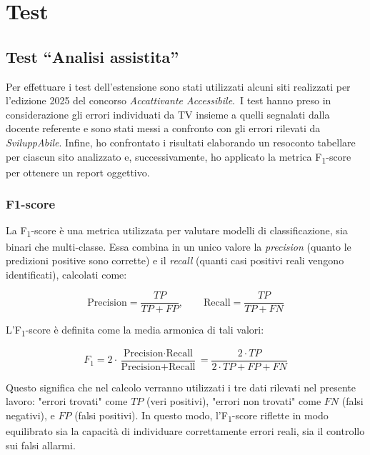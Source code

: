 
\hypersetup{
  colorlinks=true,
  linkcolor=blue,   %
  citecolor=blue,   %
  urlcolor=darkblue  %
}

\DeclareRobustCommand{\wcagref}[2][]{%
  \hyperref[#1]{\textcolor{emerald}{#2}}%
}

\chapter{Test}
\label{chap:test}

\section{Test ``Analisi assistita''}
\noindent Per effettuare i test dell’estensione sono stati utilizzati alcuni siti realizzati per l'edizione 2025 del concorso \textit{Accattivante Accessibile}.\
I test hanno preso in considerazione gli errori individuati da TV insieme a quelli segnalati dalla docente referente e sono stati messi a confronto con gli errori rilevati da \textit{SviluppAbile}.
Infine, ho confrontato i risultati elaborando un resoconto tabellare per ciascun sito analizzato e, successivamente, ho applicato la metrica F\textsubscript{1}-score per ottenere un report oggettivo.

\subsection{F1-score}
\noindent La F\textsubscript{1}-score è una metrica utilizzata per valutare modelli di classificazione, sia binari che multi‐classe. Essa combina in un unico valore la \textit{precision} (quanto le predizioni positive sono corrette) e il \textit{recall} (quanti casi positivi reali vengono identificati), calcolati come:

\[
\text{Precision} = \frac{TP}{TP + FP}, 
\qquad
\text{Recall} = \frac{TP}{TP + FN}
\]

\vspace{0.5cm}
\noindent L’F\textsubscript{1}-score è definita come la media armonica di tali valori:

\[
F_{1} = 2 \cdot \frac{\text{Precision} \cdot \text{Recall}}{\text{Precision} + \text{Recall}}
 = \frac{2 \cdot TP}{2 \cdot TP + FP + FN}
\]
\vspace{0.1cm}

\noindent Questo significa che nel calcolo verranno utilizzati i tre dati rilevati nel presente lavoro:
"errori trovati" come \(TP\) (veri positivi), "errori non trovati" come \(FN\) (falsi negativi), e \(FP\) (falsi positivi).
In questo modo, l’F\textsubscript{1}-score riflette in modo equilibrato sia la capacità di individuare correttamente errori reali, sia il controllo sui falsi allarmi.\\

